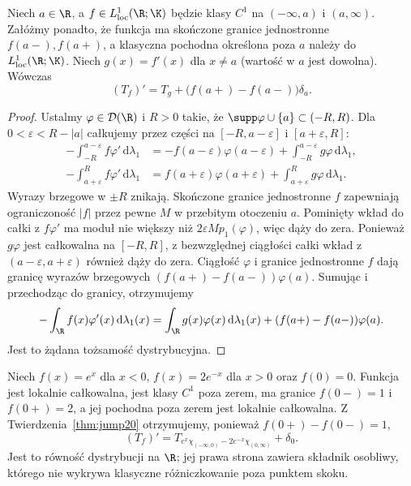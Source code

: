 \begin{twierdzenie}
\label{thm:jump20}
Niech $a\in\R$, a $f\in L^1_{\mathrm{loc}}(\R;\K)$ będzie
klasy $C^1$ na $(-\infty,a)$ i $(a,\infty)$. Załóżmy ponadto,
że funkcja ma skończone granice jednostronne
$f(a-),f(a+)$, a klasyczna pochodna określona poza $a$
należy do $L^1_{\mathrm{loc}}(\R;\K)$.
Niech $g(x)=f'(x)$ dla $x\ne a$ (wartość w $a$ jest dowolna).
Wówczas
\[
 (T_f)'=T_g+\bigl(f(a+)-f(a-)\bigr)\delta_a.
\]
\end{twierdzenie}
\begin{proof}
Ustalmy $\varphi\in\mathcal D(\R)$ i $R>0$ takie, że
$\supp\varphi\cup\{a\}\subset(-R,R)$.
Dla $0<\varepsilon<R-|a|$ całkujemy przez części na
$[-R,a-\varepsilon]$ i $[a+\varepsilon,R]$:
\[
\begin{aligned}
-\int_{-R}^{a-\varepsilon}f\varphi'\,\mathrm d\lambda_1
&=-f(a-\varepsilon)\varphi(a-\varepsilon)
 +\int_{-R}^{a-\varepsilon}g\varphi\,\mathrm d\lambda_1,\\
-\int_{a+\varepsilon}^Rf\varphi'\,\mathrm d\lambda_1
&= f(a+\varepsilon)\varphi(a+\varepsilon)
 +\int_{a+\varepsilon}^Rg\varphi\,\mathrm d\lambda_1.
\end{aligned}
\]
Wyrazy brzegowe w $\pm R$ znikają.
Skończone granice jednostronne $f$ zapewniają ograniczoność
$|f|$ przez pewne $M$ w przebitym otoczeniu $a$.
Pominięty wkład do całki z $f\varphi'$ ma moduł
nie większy niż $2\varepsilon M p_1(\varphi)$,
więc dąży do zera.
Ponieważ $g\varphi$ jest całkowalna na $[-R,R]$,
z bezwzględnej ciągłości całki wkład z
$(a-\varepsilon,a+\varepsilon)$ również dąży do zera.
Ciągłość $\varphi$ i granice jednostronne $f$ dają
granicę wyrazów brzegowych
$(f(a+)-f(a-))\varphi(a)$.
Sumując i przechodząc do granicy, otrzymujemy
\[
 -\int_\R f(x)\varphi'(x)\,\mathrm d\lambda_1(x)
 =\int_\R g(x)\varphi(x)\,\mathrm d\lambda_1(x)
 +(f(a+)-f(a-))\varphi(a).
\]
Jest to żądana tożsamość dystrybucyjna.
\end{proof}

\begin{przyklad}
\label{ex:piecewise20}
Niech $f(x)=e^x$ dla $x<0$, $f(x)=2e^{-x}$ dla $x>0$
oraz $f(0)=0$. Funkcja jest lokalnie całkowalna,
jest klasy $C^1$ poza zerem, ma granice $f(0-)=1$ i $f(0+)=2$,
a jej pochodna poza zerem jest lokalnie całkowalna.
Z Twierdzenia~\ref{thm:jump20} otrzymujemy, ponieważ
$f(0+)-f(0-)=1$,
\[
 (T_f)'=T_{e^x\chi_{(-\infty,0)}
 -2e^{-x}\chi_{(0,\infty)}}+\delta_0.
\]
Jest to równość dystrybucji na $\R$; jej prawa strona
zawiera składnik osobliwy, którego nie wykrywa klasyczne
różniczkowanie poza punktem skoku.
\end{przyklad}

